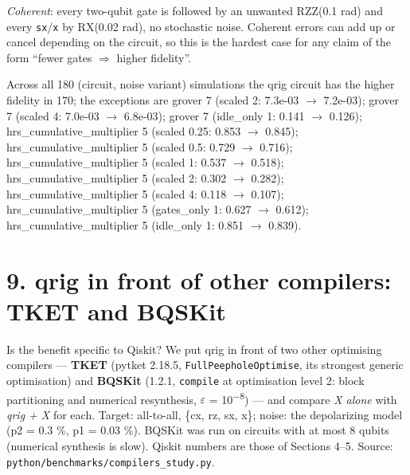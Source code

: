 \documentclass[
  10pt,
]{article}
\begin{document}
\emph{Coherent}: every two-qubit gate is followed by an unwanted RZZ(0.1
rad) and every \texttt{sx}/\texttt{x} by RX(0.02 rad), no stochastic
noise. Coherent errors can add up or cancel depending on the circuit, so
this is the hardest case for any claim of the form ``fewer gates \ensuremath{\Rightarrow}
higher fidelity''.

Across all 180 (circuit, noise variant) simulations the qrig circuit has
the higher fidelity in 170; the exceptions are grover 7 (scaled 2:
7.3e-03 \ensuremath{\rightarrow} 7.2e-03); grover 7 (scaled 4: 7.0e-03 \ensuremath{\rightarrow} 6.8e-03); grover 7
(idle\_only 1: 0.141 \ensuremath{\rightarrow} 0.126); hrs\_cumulative\_multiplier 5 (scaled
0.25: 0.853 \ensuremath{\rightarrow} 0.845); hrs\_cumulative\_multiplier 5 (scaled 0.5: 0.729 \ensuremath{\rightarrow}
0.716); hrs\_cumulative\_multiplier 5 (scaled 1: 0.537 \ensuremath{\rightarrow} 0.518);
hrs\_cumulative\_multiplier 5 (scaled 2: 0.302 \ensuremath{\rightarrow} 0.282);
hrs\_cumulative\_multiplier 5 (scaled 4: 0.118 \ensuremath{\rightarrow} 0.107);
hrs\_cumulative\_multiplier 5 (gates\_only 1: 0.627 \ensuremath{\rightarrow} 0.612);
hrs\_cumulative\_multiplier 5 (idle\_only 1: 0.851 \ensuremath{\rightarrow} 0.839).

\section{9. qrig in front of other compilers: TKET and
BQSKit}\label{qrig-in-front-of-other-compilers-tket-and-bqskit}

Is the benefit specific to Qiskit? We put qrig in front of two other
optimising compilers --- \textbf{TKET} (pytket 2.18.5,
\texttt{FullPeepholeOptimise}, its strongest generic optimisation) and
\textbf{BQSKit} (1.2.1, \texttt{compile} at optimisation level 2: block
partitioning and numerical resynthesis, \ensuremath{\varepsilon} = 10\textsuperscript{\ensuremath{-}}\textsuperscript{8}) --- and compare
\emph{X alone} with \emph{qrig + X} for each. Target: all-to-all, \{cx,
rz, sx, x\}; noise: the depolarizing model (p2 = 0.3 \%, p1 = 0.03 \%).
BQSKit was run on circuits with at most 8 qubits (numerical synthesis is
slow). Qiskit numbers are those of Sections 4--5. Source:
\texttt{python/benchmarks/compilers\_study.py}.
\end{document}

